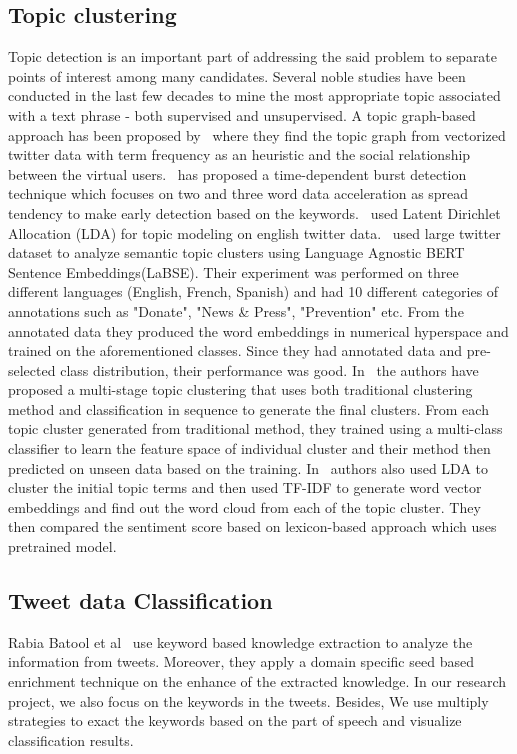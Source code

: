 \subsection{Topic clustering}
Topic detection is an important part of addressing the said problem to
separate points of interest among many candidates. Several noble studies have
been conducted in the last few decades to mine the most appropriate topic
associated with a text phrase - both supervised and unsupervised. A topic
graph-based approach has been proposed by~\cite{cataldi2010emerging} where
they find the topic graph from vectorized twitter data with term frequency as
an heuristic and the social relationship between the virtual users.~\cite
{xie2016unsupervised} has proposed a time-dependent burst detection technique
which focuses on two and three word data acceleration as spread tendency to
make early detection based on the keywords.~\cite{abd2020top} used Latent
Dirichlet Allocation (LDA) for topic modeling on english twitter data.~\cite
{gencoglu2020large} used large twitter dataset to analyze semantic topic
clusters using Language Agnostic BERT Sentence Embeddings(LaBSE). Their
experiment was performed on three different languages (English, French,
Spanish) and had 10 different categories of annotations such
as "Donate", "News \& Press", "Prevention" etc. From the annotated data they
produced the word embeddings in numerical hyperspace and trained on the
aforementioned classes. Since they had annotated data and pre-selected class
distribution, their performance was good. In~\cite{satu2021tclustvid} the
authors have proposed a multi-stage topic clustering that uses both
traditional clustering method and classification in sequence to generate the
final clusters. From each topic cluster generated from traditional method,
they trained using a multi-class classifier to learn the feature space of
individual cluster and their method then predicted on unseen data based on
the training. In~\cite{abdulaziz2021topic} authors also used LDA to cluster
the initial topic terms and then used TF-IDF to generate word vector
embeddings and find out the word cloud from each of the topic cluster. They
then compared the sentiment score based on lexicon-based approach which uses
pretrained model.

\subsection{Tweet data Classification}
Rabia Batool et al~\cite{batool2013precise} use keyword based knowledge
extraction to analyze the information from tweets. Moreover, they apply a
domain specific seed based enrichment technique on the enhance of the
extracted knowledge. In our research project, we also focus on the keywords
in the tweets. Besides, We use multiply strategies to exact the keywords
based on the part of speech and visualize classification results. 

